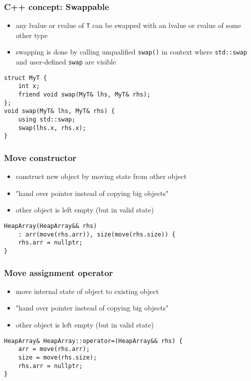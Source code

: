 \begin{frame}[fragile]
    \frametitle{C++ concept: Swappable}
    \begin{itemize}
        \item any lvalue or rvalue of \lstinline{T} can be swapped with an lvalue or rvalue of some other type
        \item swapping is done by calling unqualified \lstinline{swap()} in context where \lstinline{std::swap} and user-defined \lstinline{swap} are visible
    \end{itemize}
    \begin{lstlisting}[numbers=none]
struct MyT {
    int x;
    friend void swap(MyT& lhs, MyT& rhs);
};
void swap(MyT& lhs, MyT& rhs) {
    using std::swap;
    swap(lhs.x, rhs.x);
}
    \end{lstlisting}
\end{frame}

\begin{frame}[fragile]
    \frametitle{Move constructor}
    \begin{itemize}
        \item construct new object by moving state from other object
        \item "hand over pointer instead of copying big objects"
        \item other object is left empty (but in valid state)
    \end{itemize}
    \begin{lstlisting}[numbers=none]
HeapArray(HeapArray&& rhs) 
    : arr(move(rhs.arr)), size(move(rhs.size)) {
    rhs.arr = nullptr;
}
    \end{lstlisting}
\end{frame}

\begin{frame}[fragile]
    \frametitle{Move assignment operator}
    \begin{itemize}
        \item move internal state of object to existing object
        \item "hand over pointer instead of copying big objects"
        \item other object is left empty (but in valid state)
    \end{itemize}
    \begin{lstlisting}[numbers=none]
HeapArray& HeapArray::operator=(HeapArray&& rhs) {
    arr = move(rhs.arr);
    size = move(rhs.size);
    rhs.arr = nullptr;
}
    \end{lstlisting}
\end{frame}

